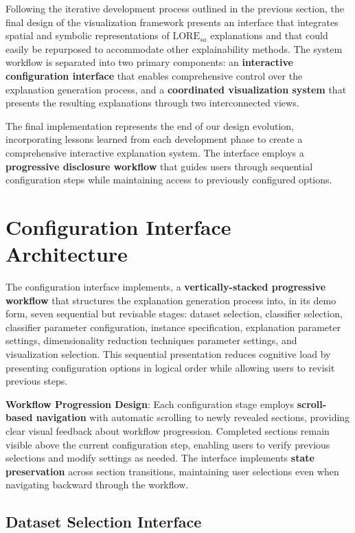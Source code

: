 

Following the iterative development process outlined in the previous section, the final design of the visualization framework presents an interface that integrates spatial and symbolic representations of $\text{LORE}_{sa}$ explanations and that could easily be repurposed to accommodate other explainability methods. The system workflow is separated into two primary components: an \textbf{interactive configuration interface} that enables comprehensive control over the explanation generation process, and a \textbf{coordinated visualization system} that presents the resulting explanations through two interconnected views.

The final implementation represents the end of our design evolution, incorporating lessons learned from each development phase to create a comprehensive interactive explanation system. The interface employs a \textbf{progressive disclosure workflow} \cite{readingsInformationVi} that guides users through sequential configuration steps while maintaining access to previously configured options.

\section{Configuration Interface Architecture}

The configuration interface implements, a \textbf{vertically-stacked progressive workflow} that structures the explanation generation process into, in its demo form, seven sequential but revisable stages: dataset selection, classifier selection, classifier parameter configuration, instance specification, explanation parameter settings, dimensionality reduction techniques parameter settings, and visualization selection. This sequential presentation reduces cognitive load by presenting configuration options in logical order while allowing users to revisit previous steps.

\textbf{Workflow Progression Design}: Each configuration stage employs \textbf{scroll-based navigation} with automatic scrolling to newly revealed sections, providing clear visual feedback about workflow progression. Completed sections remain visible above the current configuration step, enabling users to verify previous selections and modify settings as needed. The interface implements \textbf{state preservation} across section transitions, maintaining user selections even when navigating backward through the workflow.

\subsection{Dataset Selection Interface}

